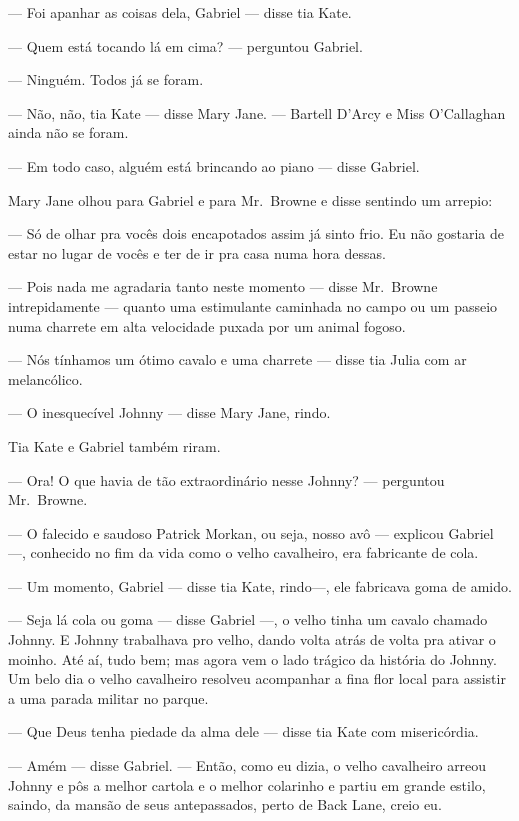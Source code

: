 --- Foi apanhar as coisas dela, Gabriel --- disse tia Kate.

--- Quem está tocando lá em cima? --- perguntou Gabriel.

--- Ninguém.  Todos já se foram.

--- Não, não, tia Kate --- disse Mary Jane.  --- Bartell D’Arcy e Miss
O’Callaghan ainda não se foram.

--- Em todo caso, alguém está brincando ao piano --- disse Gabriel.

Mary Jane olhou para Gabriel e para Mr.~Browne e disse sentindo um arrepio:

--- Só de olhar pra vocês dois encapotados assim já sinto frio.  Eu não
gostaria de estar no lugar de vocês e ter de ir pra casa numa hora dessas.

--- Pois nada me agradaria tanto neste momento --- disse Mr.~Browne
intrepidamente --- quanto uma estimulante caminhada no campo ou um passeio numa
charrete em alta velocidade puxada por um animal fogoso.

--- Nós tínhamos um ótimo cavalo e uma charrete --- disse tia Julia com ar
melancólico.

--- O inesquecível Johnny --- disse Mary Jane, rindo.

Tia Kate e Gabriel também riram.

--- Ora!  O que havia de tão extraordinário nesse Johnny? --- perguntou 
Mr.~Browne.

--- O falecido e saudoso Patrick Morkan, ou seja, nosso avô --- explicou
Gabriel ---, conhecido no fim da vida como o velho cavalheiro, era fabricante
de cola.

--- Um momento, Gabriel --- disse tia Kate, rindo---, ele fabricava goma de
amido.

--- Seja lá cola ou goma --- disse Gabriel ---, o velho tinha um cavalo chamado
Johnny.  E Johnny trabalhava pro velho, dando volta atrás de volta pra ativar o
moinho.  Até aí, tudo bem; mas agora vem o lado trágico da história do Johnny.
Um belo dia o velho cavalheiro resolveu acompanhar a fina flor local para
assistir a uma parada militar no parque.

--- Que Deus tenha piedade da alma dele --- disse tia Kate com misericórdia.

--- Amém --- disse Gabriel.  --- Então, como eu dizia, o velho cavalheiro
arreou Johnny e pôs a melhor cartola e o melhor colarinho e partiu em grande
estilo, saindo, da mansão de seus antepassados, perto de Back Lane, creio eu.

